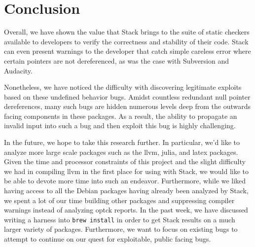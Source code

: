 \documentclass[10pt,twocolumn]{article}
\begin{document}
\section{Conclusion}
\label{sec:conclusion}
Overall, we have shown the value that Stack brings to the suite of static
checkers available to developers to verify the correctness and stability of
their code. Stack can even present warnings to the developer that catch simple
careless error where certain pointers are not dereferenced, as was the case
with Subversion and Audacity.

Nonetheless, we have noticed the difficulty with discovering legitimate
exploits based on these undefined behavior bugs. Amidst countless redundant
null pointer dereferences, many such bugs are hidden numerous levels deep from
the outwards facing components in these packages. As a result, the ability to
propagate an invalid input into such a bug and then exploit this bug is highly
challenging.

In the future, we hope to take this research further. In particular, we'd like
to analyze more large scale packages such as the llvm, julia, and latex
packages. Given the time and processor constraints of this project and the
slight difficulty we had in compiling llvm in the first place for using with
Stack, we would like to be able to devote more time into such an endeavor.
Furthermore, while we liked having access to all the Debian packages having
already been analyzed by Stack, we spent a lot of our time building other
packages and suppressing compiler warnings instead of analyzing optck reports.
In the past week, we have discussed writing a harness into \texttt{brew
install} in order to get Stack results on a much larger variety of packages.
Furthermore, we want to focus on existing bugs to attempt to continue on our
quest for exploitable, public facing bugs.



\end{document}
